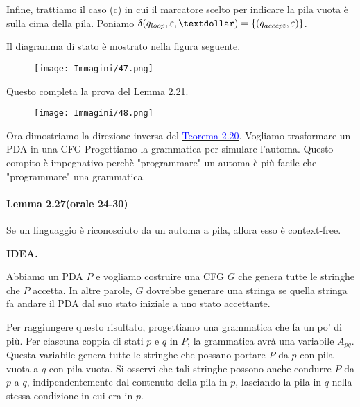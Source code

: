 \documentclass{article}
\begin{document}
Infine, trattiamo il caso (c) in cui il marcatore scelto per indicare la pila vuota \textdollar \text{ }è sulla cima della pila.
Poniamo $\delta(q_{loop},\varepsilon,\textdollar) = \{(q_{accept},\varepsilon)\}$.

Il diagramma di stato è mostrato nella figura seguente.
\begin{figure}[H]
    \centering
    \texttt{[image: Immagini/47.png]}
    \label{fig:state_diagram1}
\end{figure}
Questo completa la prova del Lemma 2.21.

\begin{figure}[H]
    \centering
    \texttt{[image: Immagini/48.png]}
    \label{fig:your_imag1}
\end{figure}

Ora dimostriamo la direzione inversa del \hyperref[teorema-2.20]{\textcolor{blue}{Teorema 2.20}}.
Vogliamo trasformare un PDA in una CFG
Progettiamo la grammatica per simulare l'automa.
Questo compito è impegnativo perchè "programmare" un automa è più facile che "programmare" una grammatica.

\paragraph{Lemma 2.27(orale 24-30)}
\label{lemma-2.27}
\text{ }

\begin{tcolorbox}[colback=blue!10!white, colframe=blue!50!black, title=Lemma 2.27]
    Se un linguaggio è riconosciuto da un automa a pila, allora esso è context-free.
\end{tcolorbox}

\textbf{IDEA.}

Abbiamo un PDA $P$ e vogliamo costruire una CFG $G$ che genera tutte le stringhe che $P$ accetta. 
In altre parole, $G$ dovrebbe generare una stringa se quella stringa fa andare il PDA dal suo stato iniziale a uno stato accettante.

Per raggiungere questo risultato, progettiamo una grammatica che fa un po' di più.
Per ciascuna coppia di stati $p$ e $q$ in $P$, la grammatica avrà una variabile $A_{pq}$.
Questa variabile genera tutte le stringhe che possano portare $P$ da $p$ con pila vuota a $q$ con pila vuota.
Si osservi che tali stringhe possono anche condurre $P$ da $p$ a $q$, indipendentemente dal contenuto della pila in $p$, lasciando la pila in $q$ nella stessa condizione in cui era in $p$.
\end{document}
